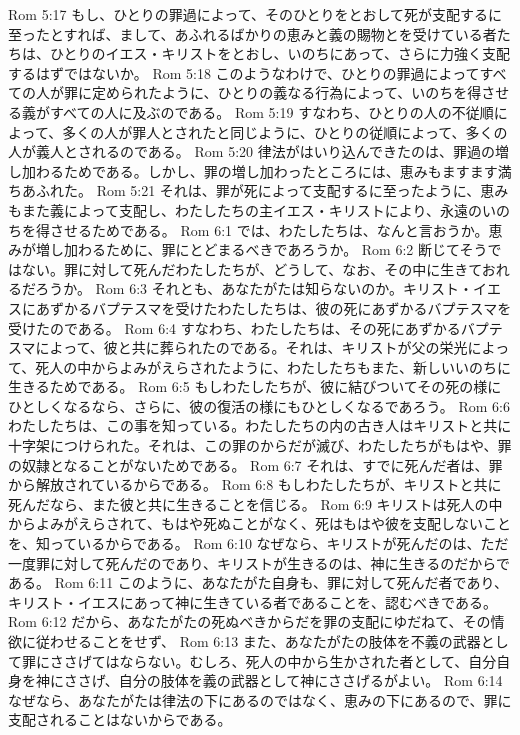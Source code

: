 Rom 5:17  もし、ひとりの罪過によって、そのひとりをとおして死が支配するに至ったとすれば、まして、あふれるばかりの恵みと義の賜物とを受けている者たちは、ひとりのイエス・キリストをとおし、いのちにあって、さらに力強く支配するはずではないか。
Rom 5:18  このようなわけで、ひとりの罪過によってすべての人が罪に定められたように、ひとりの義なる行為によって、いのちを得させる義がすべての人に及ぶのである。
Rom 5:19  すなわち、ひとりの人の不従順によって、多くの人が罪人とされたと同じように、ひとりの従順によって、多くの人が義人とされるのである。
Rom 5:20  律法がはいり込んできたのは、罪過の増し加わるためである。しかし、罪の増し加わったところには、恵みもますます満ちあふれた。
Rom 5:21  それは、罪が死によって支配するに至ったように、恵みもまた義によって支配し、わたしたちの主イエス・キリストにより、永遠のいのちを得させるためである。
Rom 6:1  では、わたしたちは、なんと言おうか。恵みが増し加わるために、罪にとどまるべきであろうか。
Rom 6:2  断じてそうではない。罪に対して死んだわたしたちが、どうして、なお、その中に生きておれるだろうか。
Rom 6:3  それとも、あなたがたは知らないのか。キリスト・イエスにあずかるバプテスマを受けたわたしたちは、彼の死にあずかるバプテスマを受けたのである。
Rom 6:4  すなわち、わたしたちは、その死にあずかるバプテスマによって、彼と共に葬られたのである。それは、キリストが父の栄光によって、死人の中からよみがえらされたように、わたしたちもまた、新しいいのちに生きるためである。
Rom 6:5  もしわたしたちが、彼に結びついてその死の様にひとしくなるなら、さらに、彼の復活の様にもひとしくなるであろう。
Rom 6:6  わたしたちは、この事を知っている。わたしたちの内の古き人はキリストと共に十字架につけられた。それは、この罪のからだが滅び、わたしたちがもはや、罪の奴隷となることがないためである。
Rom 6:7  それは、すでに死んだ者は、罪から解放されているからである。
Rom 6:8  もしわたしたちが、キリストと共に死んだなら、また彼と共に生きることを信じる。
Rom 6:9  キリストは死人の中からよみがえらされて、もはや死ぬことがなく、死はもはや彼を支配しないことを、知っているからである。
Rom 6:10  なぜなら、キリストが死んだのは、ただ一度罪に対して死んだのであり、キリストが生きるのは、神に生きるのだからである。
Rom 6:11  このように、あなたがた自身も、罪に対して死んだ者であり、キリスト・イエスにあって神に生きている者であることを、認むべきである。
Rom 6:12  だから、あなたがたの死ぬべきからだを罪の支配にゆだねて、その情欲に従わせることをせず、
Rom 6:13  また、あなたがたの肢体を不義の武器として罪にささげてはならない。むしろ、死人の中から生かされた者として、自分自身を神にささげ、自分の肢体を義の武器として神にささげるがよい。
Rom 6:14  なぜなら、あなたがたは律法の下にあるのではなく、恵みの下にあるので、罪に支配されることはないからである。
